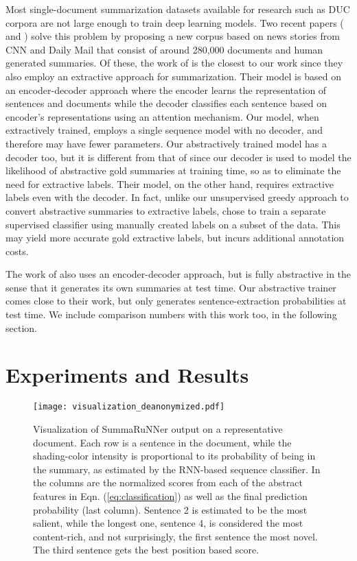 \documentclass[letterpaper]{article}
\begin{document}
Most single-document summarization datasets available for research such as DUC corpora are not large enough to train deep learning models. Two recent papers (\cite{nallapati_conll} and \cite{jianpeng}) solve this problem by proposing a new corpus based on news stories from CNN and Daily Mail that consist of around 280,000 documents and human generated summaries. Of these, the work of \cite{jianpeng} is the closest to our work since they also employ an extractive approach for summarization. Their model is based on an encoder-decoder approach where the encoder learns the representation of sentences and documents while the decoder classifies each sentence based on encoder's representations using an attention mechanism. Our model, when extractively trained, employs a single sequence model with no decoder, and therefore may have fewer parameters. Our abstractively trained model has a decoder too, but it is different from that of \cite{jianpeng} since our decoder is used to model the likelihood of abstractive gold summaries at training time, so as to eliminate the need for extractive labels. Their model, on the other hand, requires extractive labels even with the decoder. In fact, unlike our unsupervised greedy approach to convert abstractive summaries to extractive labels, \cite{jianpeng} chose to train a separate supervised classifier using manually created labels on a subset of the data. This may yield more accurate gold extractive labels, but incurs additional annotation costs.

The work of \cite{nallapati_conll} also uses an encoder-decoder approach, but is fully abstractive in the sense that it generates its own summaries at test time. Our abstractive trainer comes close to their work, but only generates sentence-extraction probabilities at test time. We include comparison numbers with this work too, in the following section.

\section{Experiments and Results}\label{sec:exp}

\begin{figure*}[htpb]
    \vspace{-0.6in}
	\centering
  \texttt{[image: visualization\_deanonymized.pdf]}
  	\vspace{-2.7in}
	\caption{{\small Visualization of SummaRuNNer output on a representative document. Each row is a sentence in the document, while the shading-color intensity is proportional to its probability of being in the summary, as estimated by the RNN-based sequence classifier. In the columns are the normalized scores from each of the abstract features in Eqn. (\ref{eq:classification}) as well as the final prediction probability (last column). Sentence 2 is estimated to be the most salient, while the longest one, sentence 4, is considered the most content-rich, and not surprisingly, the first sentence the most novel. The third sentence gets the best position based score.}}
	\label{fig:heatmap}
\end{figure*}
\end{document}
